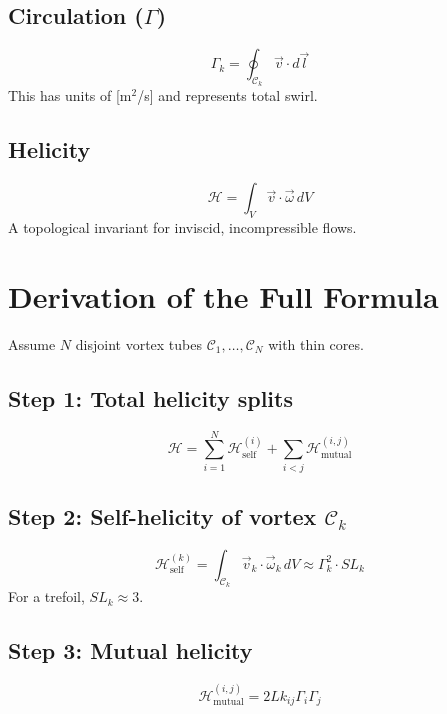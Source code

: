 \subsection{ Circulation ($\Gamma$)}
\begin{equation}
    \Gamma_k = \oint_{\mathcal{C}_k} \vec{v} \cdot d\vec{l}
\end{equation}
This has units of [m$^2$/s] and represents total swirl.

\subsection{ Helicity}
\begin{equation}
    \mathcal{H} = \int_V \vec{v} \cdot \vec{\omega} \, dV
\end{equation}
A topological invariant for inviscid, incompressible flows.

\section{ Derivation of the Full Formula}
Assume $N$ disjoint vortex tubes $\mathcal{C}_1, \dots, \mathcal{C}_N$ with thin cores.

\subsection*{Step 1: Total helicity splits}
\begin{equation}
    \mathcal{H} = \sum_{i=1}^N \mathcal{H}_{\text{self}}^{(i)} + \sum_{i < j} \mathcal{H}_{\text{mutual}}^{(i,j)}
\end{equation}

\subsection*{Step 2: Self-helicity of vortex $\mathcal{C}_k$}
\begin{equation}
    \mathcal{H}_{\text{self}}^{(k)} = \int_{\mathcal{C}_k} \vec{v}_k \cdot \vec{\omega}_k \, dV \approx \Gamma_k^2 \cdot SL_k
\end{equation}
For a trefoil, $SL_k \approx 3$.

\subsection*{Step 3: Mutual helicity}
\begin{equation}
    \mathcal{H}_{\text{mutual}}^{(i,j)} = 2 Lk_{ij} \Gamma_i \Gamma_j
\end{equation}

